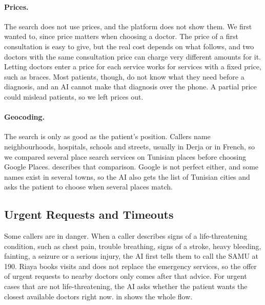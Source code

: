 \paragraph{Prices.} The search does not use prices, and the platform does not show them. We first wanted to, since price matters when choosing a doctor. The price of a first consultation is easy to give, but the real cost depends on what follows, and two doctors with the same consultation price can charge very different amounts for it. Letting doctors enter a price for each service works for services with a fixed price, such as braces. Most patients, though, do not know what they need before a diagnosis, and an AI cannot make that diagnosis over the phone. A partial price could mislead patients, so we left prices out.

\paragraph{Geocoding.} The search is only as good as the patient's position. Callers name neighbourhoods, hospitals, schools and streets, usually in Derja or in French, so we compared several place search services on Tunisian places before choosing Google Places.  describes that comparison. Google is not perfect either, and some names exist in several towns, so the AI also gets the list of Tunisian cities and asks the patient to choose when several places match.

\subsection{Urgent Requests and Timeouts}\label{subsec:urgencies}

Some callers are in danger. When a caller describes signs of a life-threatening condition, such as chest pain, trouble breathing, signs of a stroke, heavy bleeding, fainting, a seizure or a serious injury, the AI first tells them to call the SAMU at 190. Riaya books visits and does not replace the emergency services, so the offer of urgent requests to nearby doctors only comes after that advice. For urgent cases that are not life-threatening, the AI asks whether the patient wants the closest available doctors right now.  in  shows the whole flow.

